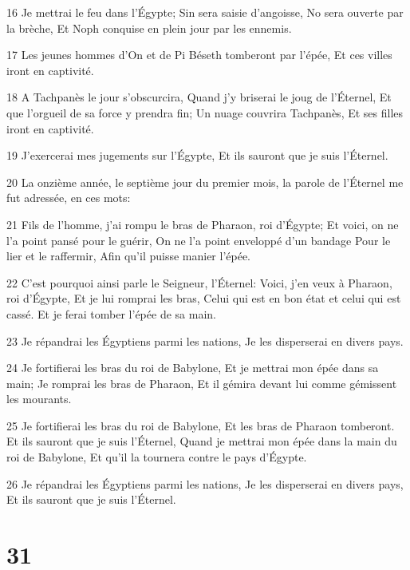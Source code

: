 \par 16 Je mettrai le feu dans l'Égypte; Sin sera saisie d'angoisse, No sera ouverte par la brèche, Et Noph conquise en plein jour par les ennemis.
\par 17 Les jeunes hommes d'On et de Pi Béseth tomberont par l'épée, Et ces villes iront en captivité.
\par 18 A Tachpanès le jour s'obscurcira, Quand j'y briserai le joug de l'Éternel, Et que l'orgueil de sa force y prendra fin; Un nuage couvrira Tachpanès, Et ses filles iront en captivité.
\par 19 J'exercerai mes jugements sur l'Égypte, Et ils sauront que je suis l'Éternel.
\par 20 La onzième année, le septième jour du premier mois, la parole de l'Éternel me fut adressée, en ces mots:
\par 21 Fils de l'homme, j'ai rompu le bras de Pharaon, roi d'Égypte; Et voici, on ne l'a point pansé pour le guérir, On ne l'a point enveloppé d'un bandage Pour le lier et le raffermir, Afin qu'il puisse manier l'épée.
\par 22 C'est pourquoi ainsi parle le Seigneur, l'Éternel: Voici, j'en veux à Pharaon, roi d'Égypte, Et je lui romprai les bras, Celui qui est en bon état et celui qui est cassé. Et je ferai tomber l'épée de sa main.
\par 23 Je répandrai les Égyptiens parmi les nations, Je les disperserai en divers pays.
\par 24 Je fortifierai les bras du roi de Babylone, Et je mettrai mon épée dans sa main; Je romprai les bras de Pharaon, Et il gémira devant lui comme gémissent les mourants.
\par 25 Je fortifierai les bras du roi de Babylone, Et les bras de Pharaon tomberont. Et ils sauront que je suis l'Éternel, Quand je mettrai mon épée dans la main du roi de Babylone, Et qu'il la tournera contre le pays d'Égypte.
\par 26 Je répandrai les Égyptiens parmi les nations, Je les disperserai en divers pays, Et ils sauront que je suis l'Éternel.

\chapter{31}

